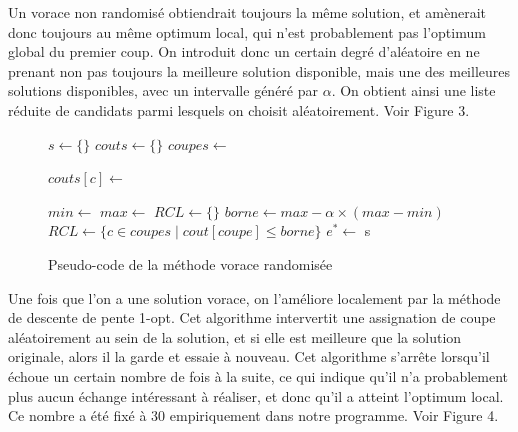 \documentclass[10pt,a4paper]{article}
\begin{document}
Un vorace non randomisé obtiendrait toujours la même solution, et amènerait donc toujours au même optimum local, qui n'est probablement pas l'optimum global du premier coup.
On introduit donc un certain degré d'aléatoire en ne prenant non pas toujours la meilleure solution disponible, mais une des meilleures solutions disponibles, avec un intervalle généré par $ \alpha $. On obtient ainsi une liste réduite de candidats parmi lesquels on choisit aléatoirement. Voir Figure 3.

\newpage

\begin{figure}[h!]
\begin{algorithmic}
	\State $s \gets \{\}$
	\State $couts \gets \{\}$
	\State $coupes \gets $ 
	
		\State $couts[c] \gets $ 
	\EndFor
	
		\State $min \gets $ 
		\State $max \gets $ 
		\State $RCL \gets \{\}$
		\State $borne \gets max - \alpha \times (max - min) $
		\State $RCL \gets \{c \in coupes \mid cout[coupe] \leq borne\} $
		\State $e^{*} \gets $ 
		\State {}
		\State {}
		\State {}
	\EndFor	
	\State \Return s
\EndFunction

\end{algorithmic}
\caption{Pseudo-code de la méthode vorace randomisée}
\end{figure}

Une fois que l'on a une solution vorace, on l'améliore localement par la méthode de descente de pente 1-opt. Cet algorithme intervertit une assignation de coupe aléatoirement au sein de la solution, et si elle est meilleure que la solution originale, alors il la garde et essaie à nouveau.
Cet algorithme s'arrête lorsqu'il échoue un certain nombre de fois à la suite, ce qui indique qu'il n'a probablement plus aucun échange intéressant à réaliser, et donc qu'il a atteint l'optimum local. Ce nombre a été fixé à 30 empiriquement dans notre programme. Voir Figure 4.

\newpage
\end{document}
